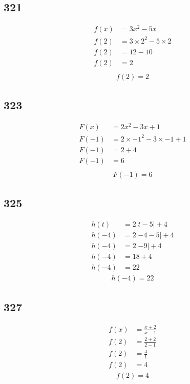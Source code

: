 \documentclass{article}
\begin{document}
    \subsection*{321}
    \begin{align*}
        f(x) &= 3x^2 - 5x\\
        f(2) &= 3 \times 2^2 - 5 \times 2\\
        f(2) &= 12 - 10\\
        f(2) &= 2\\
    \end{align*}
    \begin{align*}
        \boxed{f(2) = 2}
    \end{align*}

    \subsection*{323}
    \begin{align*}
        F(x) &= 2x^2 - 3x + 1\\
        F(-1) &= 2 \times -1^2 - 3 \times -1 + 1\\
        F(-1) &= 2 + 4\\
        F(-1) &= 6\\
    \end{align*}
    \begin{align*}
        \boxed{F(-1) = 6}
    \end{align*}

    \subsection*{325}
    \begin{align*}
        h(t) &= 2|t - 5| + 4\\
        h(-4) &= 2|-4 - 5| + 4\\
        h(-4) &= 2|-9| + 4\\
        h(-4) &= 18 + 4\\
        h(-4) &= 22
    \end{align*}
    \begin{align*}
        \boxed{h(-4) = 22}
    \end{align*}

    \subsection*{327}
    \begin{align*}
        f(x) & = \frac{x + 2}{x - 1}\\
        f(2) & = \frac{2 + 2}{2 - 1}\\
        f(2) & = \frac{4}{1}\\
        f(2) & = 4
    \end{align*}
    \begin{align*}
        \boxed{f(2) = 4}
    \end{align*}
\end{document}
